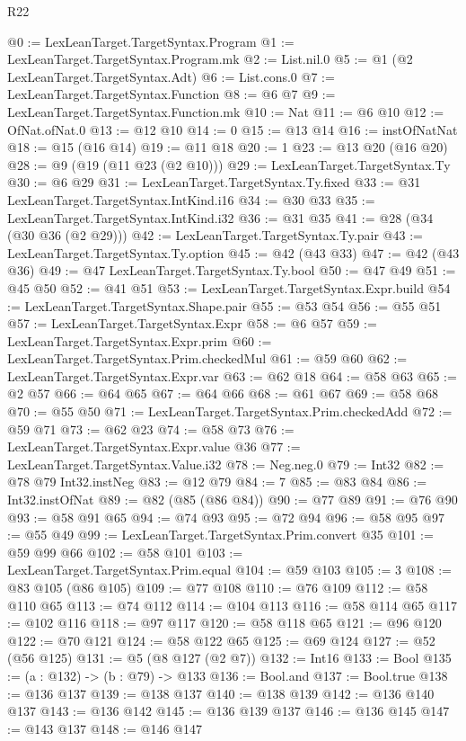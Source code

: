 \begin{lexlean}{R22}
\begin{coremodule}
{{{{{@0 := LexLeanTarget.TargetSyntax.Program
@1 := LexLeanTarget.TargetSyntax.Program.mk
@2 := List.nil.{0}
@5 := @1 (@2 LexLeanTarget.TargetSyntax.Adt)
@6 := List.cons.{0}
@7 := LexLeanTarget.TargetSyntax.Function
@8 := @6 @7
@9 := LexLeanTarget.TargetSyntax.Function.mk
@10 := Nat
@11 := @6 @10
@12 := OfNat.ofNat.{0}
@13 := @12 @10
@14 := 0
@15 := @13 @14
@16 := instOfNatNat
@18 := @15 (@16 @14)
@19 := @11 @18
@20 := 1
@23 := @13 @20 (@16 @20)
@28 := @9 (@19 (@11 @23 (@2 @10)))
@29 := LexLeanTarget.TargetSyntax.Ty
@30 := @6 @29
@31 := LexLeanTarget.TargetSyntax.Ty.fixed
@33 := @31 LexLeanTarget.TargetSyntax.IntKind.i16
@34 := @30 @33
@35 := LexLeanTarget.TargetSyntax.IntKind.i32
@36 := @31 @35
@41 := @28 (@34 (@30 @36 (@2 @29)))
@42 := LexLeanTarget.TargetSyntax.Ty.pair
@43 := LexLeanTarget.TargetSyntax.Ty.option
@45 := @42 (@43 @33)
@47 := @42 (@43 @36)
@49 := @47 LexLeanTarget.TargetSyntax.Ty.bool
@50 := @47 @49
@51 := @45 @50
@52 := @41 @51
@53 := LexLeanTarget.TargetSyntax.Expr.build
@54 := LexLeanTarget.TargetSyntax.Shape.pair
@55 := @53 @54
@56 := @55 @51
@57 := LexLeanTarget.TargetSyntax.Expr
@58 := @6 @57
@59 := LexLeanTarget.TargetSyntax.Expr.prim
@60 := LexLeanTarget.TargetSyntax.Prim.checkedMul
@61 := @59 @60
@62 := LexLeanTarget.TargetSyntax.Expr.var
@63 := @62 @18
@64 := @58 @63
@65 := @2 @57
@66 := @64 @65
@67 := @64 @66
@68 := @61 @67
@69 := @58 @68
@70 := @55 @50
@71 := LexLeanTarget.TargetSyntax.Prim.checkedAdd
@72 := @59 @71
@73 := @62 @23
@74 := @58 @73
@76 := LexLeanTarget.TargetSyntax.Expr.value @36
@77 := LexLeanTarget.TargetSyntax.Value.i32
@78 := Neg.neg.{0}
@79 := Int32
@82 := @78 @79 Int32.instNeg
@83 := @12 @79
@84 := 7
@85 := @83 @84
@86 := Int32.instOfNat
@89 := @82 (@85 (@86 @84))
@90 := @77 @89
@91 := @76 @90
@93 := @58 @91 @65
@94 := @74 @93
@95 := @72 @94
@96 := @58 @95
@97 := @55 @49
@99 := LexLeanTarget.TargetSyntax.Prim.convert @35
@101 := @59 @99 @66
@102 := @58 @101
@103 := LexLeanTarget.TargetSyntax.Prim.equal
@104 := @59 @103
@105 := 3
@108 := @83 @105 (@86 @105)
@109 := @77 @108
@110 := @76 @109
@112 := @58 @110 @65
@113 := @74 @112
@114 := @104 @113
@116 := @58 @114 @65
@117 := @102 @116
@118 := @97 @117
@120 := @58 @118 @65
@121 := @96 @120
@122 := @70 @121
@124 := @58 @122 @65
@125 := @69 @124
@127 := @52 (@56 @125)
@131 := @5 (@8 @127 (@2 @7))
@132 := Int16
@133 := Bool
@135 := (a : @132) -> (b : @79) -> @133
@136 := Bool.and
@137 := Bool.true
@138 := @136 @137
@139 := @138 @137
@140 := @138 @139
@142 := @136 @140 @137
@143 := @136 @142
@145 := @136 @139 @137
@146 := @136 @145
@147 := @143 @137
@148 := @146 @147
}}}}}
\end{coremodule}
\end{lexlean}
